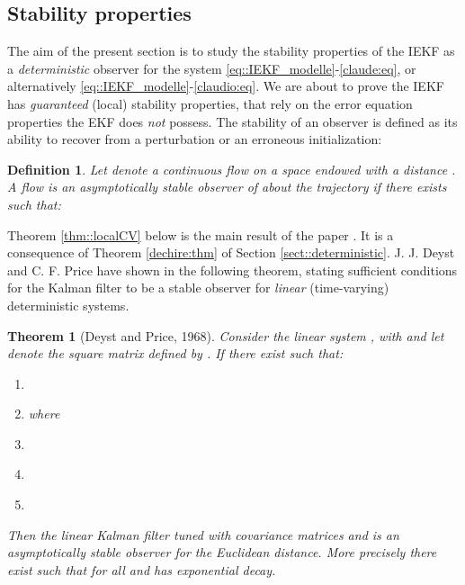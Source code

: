 \documentclass[a4paper,12pt,onecolumn]{article}
\newtheorem{thm}{Theorem}
\newtheorem{defn}{Definition}
\begin{document}
\subsection{Stability properties}
The aim of the present section is to study the stability properties of the IEKF as a \emph{deterministic} observer for the system \eqref{eq::IEKF_modelle}-\eqref{claude:eq}, or alternatively \eqref{eq::IEKF_modelle}-\eqref{claudio:eq}.  We are about to prove the IEKF has  \emph{guaranteed} (local) stability properties, that  rely on the error equation properties   the  EKF does \emph{not} possess. The stability of an observer is defined as its ability to recover from a perturbation or an erroneous initialization:
\begin{defn}\label{deff}
Let  denote a continuous flow on a space  endowed with a distance . A flow  is an asymptotically stable observer of  about the trajectory   if there exists  such that:

\end{defn}
Theorem \ref{thm::localCV} below is the main result of the paper . It is a consequence of Theorem \ref{dechire:thm} of Section \ref{sect::deterministic}.  
J. J. Deyst and C. F. Price have shown in \cite{deyst} the following theorem, stating sufficient conditions for the Kalman filter to be a stable observer for \emph{linear} (time-varying) deterministic systems.

\begin{thm}[Deyst and Price, 1968]
\label{thm::Deyst_Price}Consider the  linear system ,  with  and let  denote the square matrix defined by .
If there exist  such that: 
\begin{enumerate}[i]
\item  \label{cond::Psi}
\item  where  \label{cond::Q}
\item  \label{cond::R}
\item  \label{cond::reachable}
\item  \label{cond::observable}
\end{enumerate}
Then the linear Kalman filter tuned with covariance matrices  and  is an asymptotically stable observer for the Euclidean distance. More precisely there exist  such that  for all  and  has  exponential decay.
\end{thm}
\end{document}
